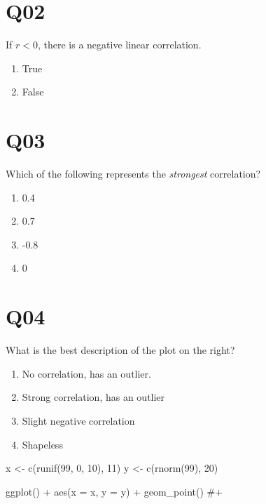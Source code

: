 \documentclass[
  letterpaper,
  DIV=11,
  numbers=noendperiod]{scrreprt}
\newenvironment{Shaded}{\begin{snugshade}}{\end{snugshade}}
\newcommand{\AttributeTok}[1]{\textcolor[rgb]{0.40,0.45,0.13}{#1}}
\newcommand{\CommentTok}[1]{\textcolor[rgb]{0.37,0.37,0.37}{#1}}
\newcommand{\DecValTok}[1]{\textcolor[rgb]{0.68,0.00,0.00}{#1}}
\newcommand{\FunctionTok}[1]{\textcolor[rgb]{0.28,0.35,0.67}{#1}}
\newcommand{\NormalTok}[1]{\textcolor[rgb]{0.00,0.23,0.31}{#1}}
\newcommand{\OtherTok}[1]{\textcolor[rgb]{0.00,0.23,0.31}{#1}}
\newcommand{\SpecialCharTok}[1]{\textcolor[rgb]{0.37,0.37,0.37}{#1}}
\providecommand{\tightlist}{%
  \setlength{\itemsep}{0pt}\setlength{\parskip}{0pt}}\usepackage{longtable,booktabs,array}
\begin{document}
\hypertarget{q02}{%
\section{Q02}\label{q02}}

If \(r < 0\), there is a negative linear correlation.

\begin{enumerate}
\def\labelenumi{\arabic{enumi}.}
\tightlist
\item
  True
\item
  False
\end{enumerate}

\hypertarget{q03}{%
\section{Q03}\label{q03}}

Which of the following represents the \emph{strongest} correlation?

\begin{enumerate}
\def\labelenumi{\arabic{enumi}.}
\tightlist
\item
  0.4
\item
  0.7
\item
  -0.8
\item
  0
\end{enumerate}

\hypertarget{q04}{%
\section{Q04}\label{q04}}

\vspace{1cm}

What is the best description of the plot on the right?

\begin{enumerate}
\def\labelenumi{\arabic{enumi}.}
\tightlist
\item
  No correlation, has an outlier.
\item
  Strong correlation, has an outlier
\item
  Slight negative correlation
\item
  Shapeless
\end{enumerate}

\begin{Shaded}
\begin{Highlighting}[]
\NormalTok{x }\OtherTok{\textless{}{-}} \FunctionTok{c}\NormalTok{(}\FunctionTok{runif}\NormalTok{(}\DecValTok{99}\NormalTok{, }\DecValTok{0}\NormalTok{, }\DecValTok{10}\NormalTok{), }\DecValTok{11}\NormalTok{)}
\NormalTok{y }\OtherTok{\textless{}{-}} \FunctionTok{c}\NormalTok{(}\FunctionTok{rnorm}\NormalTok{(}\DecValTok{99}\NormalTok{), }\DecValTok{20}\NormalTok{)}

\FunctionTok{ggplot}\NormalTok{() }\SpecialCharTok{+} \FunctionTok{aes}\NormalTok{(}\AttributeTok{x =}\NormalTok{ x, }\AttributeTok{y =}\NormalTok{ y) }\SpecialCharTok{+} \FunctionTok{geom\_point}\NormalTok{() }\CommentTok{\#+ }
\end{Highlighting}
\end{Shaded}
\end{document}

